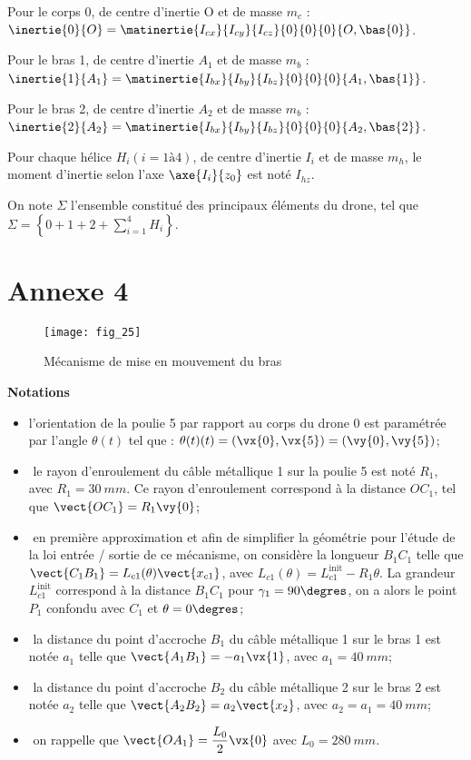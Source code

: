 Pour le corps 0, de centre d’inertie O et de masse $m_c$ : $\inertie{0}{O} = \matinertie{I_{cx}}{I_{cy}}{I_{cz}}{0}{0}{0}{O,\bas{0}}$.

Pour le bras 1, de centre d’inertie $A_1$ et de masse $m_b$ : $\inertie{1}{A_1} = \matinertie{I_{bx}}{I_{by}}{I_{bz}}{0}{0}{0}{A_1,\bas{1}}$.

Pour le bras 2, de centre d’inertie $A_2$ et de masse $m_b$ : $\inertie{2}{A_2} = \matinertie{I_{bx}}{I_{by}}{I_{bz}}{0}{0}{0}{A_2,\bas{2}}$.

Pour chaque hélice $H_i (i = 1 à 4)$, de centre d’inertie $I_i$ et de masse $m_h$, le moment d’inertie
selon l’axe $\axe{I_i}{z_0}$ est noté $I_{hz}$.

On note $\Sigma$ l’ensemble constitué des principaux éléments du drone, tel que $\Sigma = \left\{ 0+1+2+\sum_{i=1}^{4}H_i \right\}$.



\section*{Annexe 4}


\begin{figure}[H]
\centering
\texttt{[image: fig\_25]}
\caption{\label{fig:25} Mécanisme de mise en mouvement du bras}
\end{figure}

\textbf{Notations}
\begin{itemize}
\item l’orientation de la poulie 5 par rapport au corps du drone 0 est paramétrée par l’angle
$\theta(t)$ tel que : $\theta(t)(t) = \left(\vx{0},\vx{5}\right) = \left(\vy{0},\vy{5}\right)$;
\item­ le rayon d’enroulement du câble métallique 1 sur la poulie 5 est noté $R_1$, avec
$R_1 = \SI{30}{mm}$. Ce rayon d’enroulement correspond à la distance $OC_1$, tel que $\vect{OC_1}= R_1\vy{0}$;
\item­ en première approximation et afin de simplifier la géométrie pour l’étude de la loi entrée
/ sortie de ce mécanisme, on considère la longueur $B_1C_1$ telle que $\vect{C_1B_1} = L_{c1}(\theta) \vect{x_{c1}}$, avec $L_{c1}(\theta) = L^{\text{init}}_{c1} - R_1\theta$. La grandeur $L^{\text{init}}_{c1}$ correspond à la distance $B_1C_1$ pour $\gamma_1 = 90\degres$, on a
alors le point $P_1$ confondu avec $C_1$ et $\theta = 0\degres$;
\item­ la distance du point d’accroche $B_1$ du câble métallique 1 sur le bras 1 est notée $a_1$ telle
que $\vect{A_1B_1} = -a_1 \vx{1}$, avec $a_1 = \SI{40}{mm}$;
\item­ la distance du point d’accroche $B_2$ du câble métallique 2 sur le bras 2 est notée $a_2$ telle
que $\vect{A_2B_2} = a_2 \vect{x_2}$, avec $a_2 = a_1 = \SI{40}{mm}$;
\item­ on rappelle que $\vect{OA_1} = \dfrac{L_0}{2}\vx{0}$  avec $L_0 = \SI{280}{mm}$.
\end{itemize}

